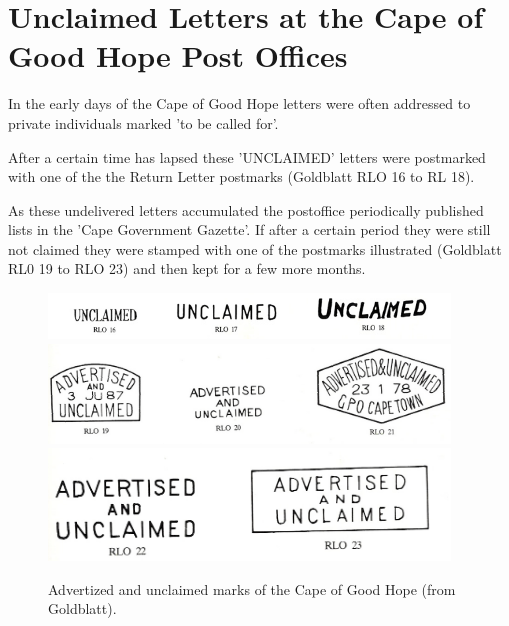 \section{Unclaimed Letters at the Cape of Good Hope Post Offices}





	 


In the early days of the Cape of Good Hope letters were often addressed to private individuals marked 'to be called for'.

After a certain time has lapsed these 'UNCLAIMED' letters were postmarked with one of 
the the Return Letter postmarks (Goldblatt RLO 16 to RL 18).

As these undelivered letters accumulated the postoffice periodically published lists in the 'Cape Government Gazette'. If after a certain period they were still not claimed they were stamped with one of the postmarks illustrated (Goldblatt RL0 19 to RLO 23) and then kept for a few more months.

\begin{figure}[htbp]
\includegraphics[width=0.95\textwidth]{../cape-of-good-hope/Advertized-and-Unclaimed/Unclaimed-postmarks.jpg}
\includegraphics[width=0.95\textwidth]{../cape-of-good-hope/Advertized-and-Unclaimed/Advertized-and-Unclaimed-Postmarks.jpg}
\includegraphics[width=0.95\textwidth]{../cape-of-good-hope/Advertized-and-Unclaimed/Advertized-and-Unclaimed-Postmarks-2.jpg}
\caption{Advertized and unclaimed marks of the Cape of Good Hope (from Goldblatt).}
\end{figure}

